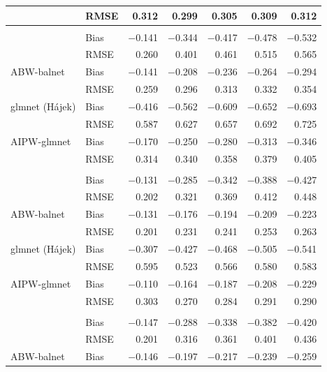 \documentclass[
  12pt,
  a4paper,
]{article}
\makeatletter
\renewenvironment{atbl}{\par\if@nobreak\else\Needspace*{6\baselineskip}\fi\def\@captype{atbl}\def\fps@table{H}}{\par}%
\makeatother
\begin{document}
\begin{atbl}
{\begin{longtable*}{llrrrrr}
{} & {RMSE} & {0.312} & {0.299} & {0.305} & {0.309} & {0.312} \\ 
\midrule\addlinespace[2.5pt]
 \\[2.5pt] 
\midrule{} & {Bias} & {−0.141} & {−0.344} & {−0.417} & {−0.478} & {−0.532} \\ 
{} & {RMSE} & {0.260} & {0.401} & {0.461} & {0.515} & {0.565} \\ 
{ABW-balnet} & {Bias} & {−0.141} & {−0.208} & {−0.236} & {−0.264} & {−0.294} \\ 
{} & {RMSE} & {0.259} & {0.296} & {0.313} & {0.332} & {0.354} \\ 
{glmnet (Hájek)} & {Bias} & {−0.416} & {−0.562} & {−0.609} & {−0.652} & {−0.693} \\ 
{} & {RMSE} & {0.587} & {0.627} & {0.657} & {0.692} & {0.725} \\ 
{AIPW-glmnet} & {Bias} & {−0.170} & {−0.250} & {−0.280} & {−0.313} & {−0.346} \\ 
{} & {RMSE} & {0.314} & {0.340} & {0.358} & {0.379} & {0.405} \\ 
\midrule\addlinespace[2.5pt]
 \\[2.5pt] 
\midrule{} & {Bias} & {−0.131} & {−0.285} & {−0.342} & {−0.388} & {−0.427} \\ 
{} & {RMSE} & {0.202} & {0.321} & {0.369} & {0.412} & {0.448} \\ 
{ABW-balnet} & {Bias} & {−0.131} & {−0.176} & {−0.194} & {−0.209} & {−0.223} \\ 
{} & {RMSE} & {0.201} & {0.231} & {0.241} & {0.253} & {0.263} \\ 
{glmnet (Hájek)} & {Bias} & {−0.307} & {−0.427} & {−0.468} & {−0.505} & {−0.541} \\ 
{} & {RMSE} & {0.595} & {0.523} & {0.566} & {0.580} & {0.583} \\ 
{AIPW-glmnet} & {Bias} & {−0.110} & {−0.164} & {−0.187} & {−0.208} & {−0.229} \\ 
{} & {RMSE} & {0.303} & {0.270} & {0.284} & {0.291} & {0.290} \\ 
\midrule\addlinespace[2.5pt]
 \\[2.5pt] 
\midrule{} & {Bias} & {−0.147} & {−0.288} & {−0.338} & {−0.382} & {−0.420} \\ 
{} & {RMSE} & {0.201} & {0.316} & {0.361} & {0.401} & {0.436} \\ 
{ABW-balnet} & {Bias} & {−0.146} & {−0.197} & {−0.217} & {−0.239} & {−0.259} \\ 

\end{longtable*}}
\end{atbl}
\end{document}
